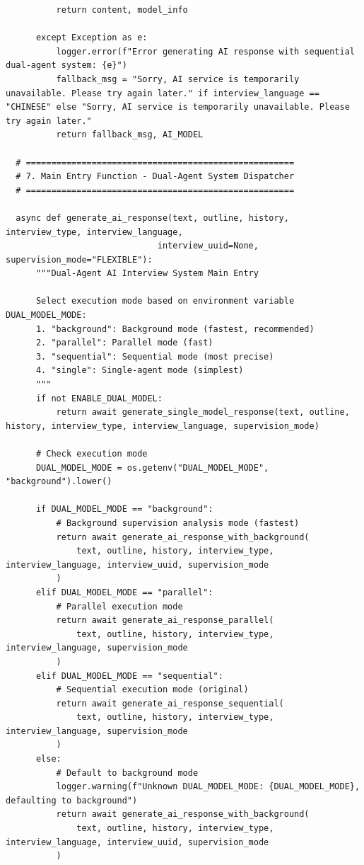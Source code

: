 \documentclass[sigchi,nonacm,manuscript]{acmart}
\begin{document}
\begin{lstlisting}
          return content, model_info
          
      except Exception as e:
          logger.error(f"Error generating AI response with sequential dual-agent system: {e}")
          fallback_msg = "Sorry, AI service is temporarily unavailable. Please try again later." if interview_language == "CHINESE" else "Sorry, AI service is temporarily unavailable. Please try again later."
          return fallback_msg, AI_MODEL

  # =====================================================
  # 7. Main Entry Function - Dual-Agent System Dispatcher
  # =====================================================

  async def generate_ai_response(text, outline, history, interview_type, interview_language, 
                              interview_uuid=None, supervision_mode="FLEXIBLE"):
      """Dual-Agent AI Interview System Main Entry
      
      Select execution mode based on environment variable DUAL_MODEL_MODE:
      1. "background": Background mode (fastest, recommended)
      2. "parallel": Parallel mode (fast)
      3. "sequential": Sequential mode (most precise)
      4. "single": Single-agent mode (simplest)
      """
      if not ENABLE_DUAL_MODEL:
          return await generate_single_model_response(text, outline, history, interview_type, interview_language, supervision_mode)
      
      # Check execution mode
      DUAL_MODEL_MODE = os.getenv("DUAL_MODEL_MODE", "background").lower()
      
      if DUAL_MODEL_MODE == "background":
          # Background supervision analysis mode (fastest)
          return await generate_ai_response_with_background(
              text, outline, history, interview_type, interview_language, interview_uuid, supervision_mode
          )
      elif DUAL_MODEL_MODE == "parallel":
          # Parallel execution mode
          return await generate_ai_response_parallel(
              text, outline, history, interview_type, interview_language, supervision_mode
          )
      elif DUAL_MODEL_MODE == "sequential":
          # Sequential execution mode (original)
          return await generate_ai_response_sequential(
              text, outline, history, interview_type, interview_language, supervision_mode
          )
      else:
          # Default to background mode
          logger.warning(f"Unknown DUAL_MODEL_MODE: {DUAL_MODEL_MODE}, defaulting to background")
          return await generate_ai_response_with_background(
              text, outline, history, interview_type, interview_language, interview_uuid, supervision_mode
          )


\end{lstlisting}
\end{document}
